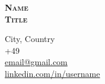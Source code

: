 \documentclass[a4,10pt]{article}
\begin{document}
\begin{minipage}[c]{0.62\textwidth}
    \raggedright
    \textbf{\Huge \scshape \color{PrimaryColor} Name} \\[10pt]
    \textbf{\Large \scshape \color{PrimaryColor} Title}
\end{minipage}%
\begin{minipage}[c]{0.38\textwidth}
    \raggedleft
    \small City, Country\\ [3pt]
    \small +49 \\ [3pt]
    \href{mailto:email@gmail.com}{\small email@gmail.com}\\ [3pt]
    \href{https://www.linkedin.com/in/username/}{\small \underline{linkedin.com/in/username}}
\end{minipage} \vspace*{-15pt}

%

\vspace*{-6pt}
\end{document}

